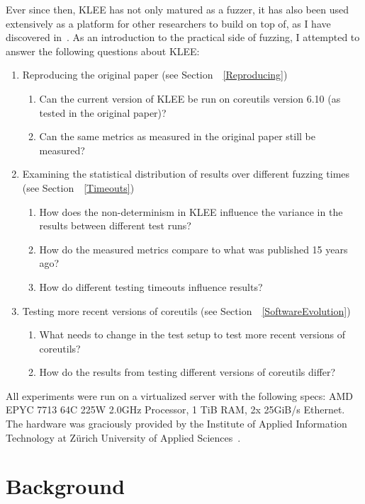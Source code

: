 \documentclass{article}
\let\savedCite=\cite
\renewcommand{\cite}{\unskip~\savedCite}
\let\savedRef=\ref
\renewcommand{\ref}{\unskip~\savedRef}
\begin{document}
Ever since then, KLEE has not only matured as a fuzzer, it has also been used extensively as a platform for other researchers to build on top of, as I have discovered in\cite{EVA}. As an introduction to the practical side of fuzzing, I attempted to answer the following questions about KLEE:

\begin{enumerate}
    \item Reproducing the original paper (see Section~\ref{Reproducing})
          \begin{enumerate}
              \item Can the current version of KLEE be run on coreutils version 6.10 (as tested in the original paper)?
              \item Can the same metrics as measured in the original paper still be measured?
          \end{enumerate}
    \item Examining the statistical distribution of results over different fuzzing times (see Section~\ref{Timeouts})
          \begin{enumerate}
              \item How does the non-determinism in KLEE influence the variance in the results between different test runs?
              \item How do the measured metrics compare to what was published 15 years ago?
              \item How do different testing timeouts influence results?
          \end{enumerate}
    \item Testing more recent versions of coreutils (see Section~\ref{SoftwareEvolution})
          \begin{enumerate}
              \item What needs to change in the test setup to test more recent versions of coreutils?
              \item How do the results from testing different versions of coreutils differ?
          \end{enumerate}
\end{enumerate}

All experiments were run on a virtualized server with the following specs: AMD EPYC 7713 64C 225W 2.0GHz Processor, 1 TiB RAM, 2x 25GiB/s Ethernet. The hardware was graciously provided by the Institute of Applied Information Technology at Zürich University of Applied Sciences\cite{InIT}.

\section{Background}
\end{document}
